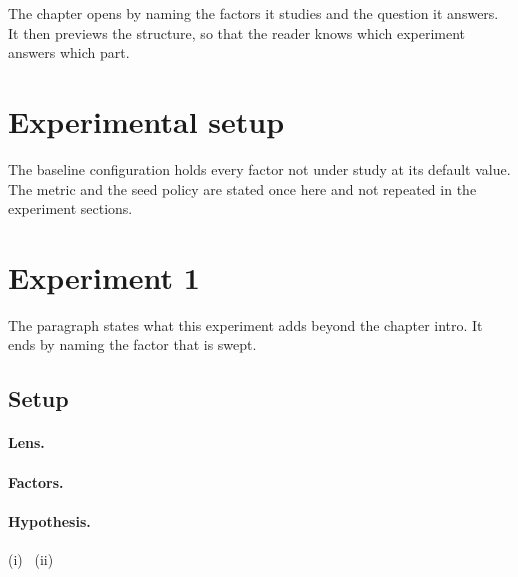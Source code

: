  The chapter opens
by naming the factors it studies and the question it answers. It then previews the
structure, so that the reader knows which experiment answers which part.

\section{Experimental setup}
\label{sec:ch2-setup}


 The baseline configuration
holds every factor not under study at its default value. The metric and the seed policy
are stated once here and not repeated in the experiment sections.

\section{Experiment 1}
\label{sec:ch2-experiment-1}


 The paragraph
states what this experiment adds beyond the chapter intro. It ends by naming the factor
that is swept.

\subsection{Setup}
\label{sec:ch2-experiment-1-setup}

\paragraph{Lens.} 

\paragraph{Factors.} 

\paragraph{Hypothesis.} (i)~
(ii)~

